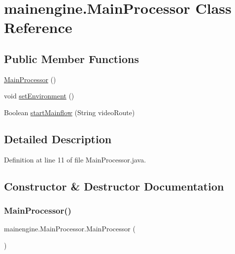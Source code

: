 \hypertarget{classmainengine_1_1_main_processor}{}\section{mainengine.\+Main\+Processor Class Reference}
\label{classmainengine_1_1_main_processor}
\subsection*{Public Member Functions}
\begin{DoxyCompactItemize}
\item 
\hyperlink{classmainengine_1_1_main_processor_a8a2da887501877affcb70982982c5d1d}{Main\+Processor} ()
\item 
void \hyperlink{classmainengine_1_1_main_processor_aee5d6816bb2dc27ea02ef5f5c4cd3355}{set\+Environment} ()
\item 
Boolean \hyperlink{classmainengine_1_1_main_processor_a270957b142cfc8aa430636545b29679f}{start\+Mainflow} (String video\+Route)
\end{DoxyCompactItemize}


\subsection{Detailed Description}


Definition at line 11 of file Main\+Processor.\+java.



\subsection{Constructor \& Destructor Documentation}
\hypertarget{classmainengine_1_1_main_processor_a8a2da887501877affcb70982982c5d1d}{}\label{classmainengine_1_1_main_processor_a8a2da887501877affcb70982982c5d1d} 
\subsubsection{\texorpdfstring{Main\+Processor()}{MainProcessor()}}
{\footnotesize\ttfamily mainengine.\+Main\+Processor.\+Main\+Processor (\begin{DoxyParamCaption}{ }\end{DoxyParamCaption})}



